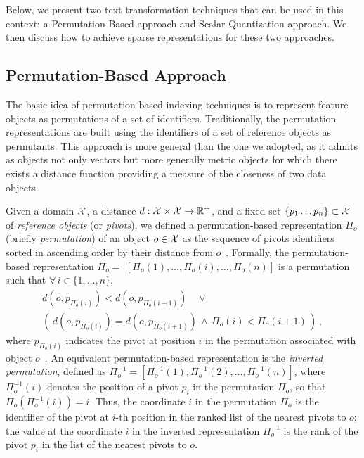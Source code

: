 Below, we present two text transformation techniques that can be used in this context: a Permutation-Based approach and Scalar Quantization approach.
We then discuss how to achieve sparse representations for these two approaches.

\subsection{Permutation-Based Approach}
\label{subsec:str:deep-permutations}

The basic idea of permutation-based indexing techniques is to represent feature objects as permutations of a set of identifiers.
Traditionally, the permutation representations are built using the identifiers of a set of reference objects as permutants.
This approach is more general than the one we adopted, as it admits as objects not only vectors but more generally metric objects for which there exists a distance function providing a measure of the closeness of two data objects.

Given a domain $\mathcal{X}$, a distance $d:\mathcal{X}\times \mathcal{X}\to \mathbb{R}^+$, and a fixed set  $\{p_1\ldots p_n\}\subset\mathcal{X}$ of \emph{reference objects} (or \emph{pivots}), we defined a permutation-based representation $\Pi_{o}$ (briefly \emph{permutation}) of an object $o\in \mathcal{X}$ as the sequence of pivots identifiers sorted in ascending order by their distance from $o$~\cite{amato2014some,amato2014mi}.
Formally, the permutation-based representation $\Pi_{o}=$ $[\Pi_{o}(1), \ldots, \Pi_{o}(i), \ldots , \Pi_{o}(n)]$ is a permutation such that $\forall\, i \in \{1,\ldots, n\}$,
\begin{multline}
d(o,p_{\Pi_{o}(i)}) < d(o,p_{\Pi_{o}(i+1)}) \quad \vee \\
\left(\, d(o,p_{\Pi_{o}(i)}) = d(o,p_{\Pi_{o}(i+1)})\, \wedge\, \Pi_{o}(i) < \Pi_{o}(i+1)\, \right) \,,
\end{multline}
where $p_{\Pi_o(i)}$ indicates the pivot at position $i$ in the permutation associated with object $o$~\cite{novak2016ppp}.
An equivalent permutation-based representation is the \emph{inverted permutation}, defined as  $\Pi^{-1}_{o}=[\Pi_{o}^{-1}(1), \Pi_{o}^{-1}(2),\dots , \Pi_{o}^{-1}(n)]$, where $\Pi_{o}^{-1}(i)$ denotes the position of a pivot $p_i$ in the permutation $\Pi_{o}$, so that $\Pi_o(\Pi_o^{-1}(i))=i$.
Thus, the coordinate $i$ in the permutation $\Pi_{o}$ is the identifier of the pivot at $i$-th position in the ranked list of the nearest pivots to $o$;
the value at the coordinate $i$ in the inverted representation $\Pi^{-1}_{o}$ is the rank of the pivot $p_i$ in the list of the nearest pivots to $o$.

